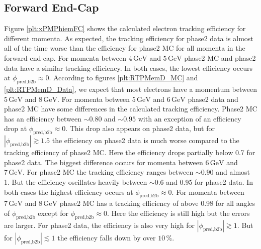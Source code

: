 \documentclass[a4paper,11pt,twosided,final,german,openbib,pdftex,listof=totoc,bibliography=totoc]{scrbook}
\begin{document}
\subsection{Forward End-Cap}
\label{sec:MFC}

Figure \ref{plt:xPMPhiemFC} shows the calculated electron tracking efficiency for different momenta. As expected, the tracking efficiency for phase2 data is almost all of the time worse than the efficiency for phase2 MC for all momenta in the forward end-cap. For momenta between $4\,\textrm{GeV}$ and $5\,\textrm{GeV}$ phase2 MC and phase2 data have a similar tracking efficiency. In both cases, the lowest efficiency occurs at $\phi_{\textrm{pred,b2b}} \approx 0$. According to figures \ref{plt:RTPMemD_MC} and \ref{plt:RTPMemD_Data}, we expect that most electrons have a momentum between $5\,\textrm{GeV}$ and $8\,\textrm{GeV}$. For momenta between $5\,\textrm{GeV}$ and $6\,\textrm{GeV}$ phase2 data and phase2 MC have some differences in the calculated tracking efficiency. Phase2 MC has an efficiency between $\sim 0.80$ and $\sim 0.95$ with an exception of an efficiency drop at $\phi_{\textrm{pred,b2b}} \approx 0$. This drop also appears on phase2 data, but for $|\phi_{\textrm{pred,b2b}}| \gtrsim 1.5$ the efficiency on phase2 data is much worse compared to the tracking efficiency of phase2 MC. Here the efficiency drops partially below 0.7 for phase2 data.
The biggest difference occurs for momenta between $6\,\textrm{GeV}$ and $7\,\textrm{GeV}$. For phase2 MC the tracking efficiency ranges between $\sim 0.90$ and almost 1. But the efficiency oscillates heavily between $\sim 0.6$ and 0.95 for phase2 data. In both cases the highest efficiency occurs at $\phi_{\textrm{pred,b2b}} \approx 0$. 
For momenta between $7\,\textrm{GeV}$ and $8\,\textrm{GeV}$ phase2 MC has a tracking efficiency of above 0.98 for all angles of $\phi_{\textrm{pred,b2b}}$ except for $\phi_{\textrm{pred,b2b}} \approx 0$. Here the efficiency is still high but the errors are larger. For phase2 data, the efficiency is also very high for $|\phi_{\textrm{pred,b2b}}| \gtrsim 1$. But for $|\phi_{\textrm{pred,b2b}}| \lesssim 1$ the efficiency falls down by over $10\,\%$.
\end{document}
